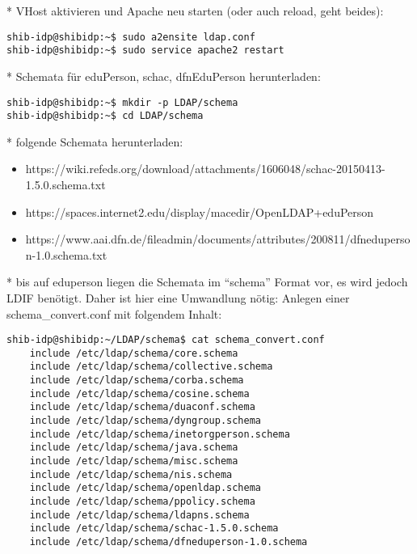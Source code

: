* VHost aktivieren und Apache neu starten (oder auch reload, geht beides):
\begin{lstlisting}
shib-idp@shibidp:~$ sudo a2ensite ldap.conf
shib-idp@shibidp:~$ sudo service apache2 restart
\end{lstlisting}

* Schemata für eduPerson, schac, dfnEduPerson herunterladen:
\begin{lstlisting}
shib-idp@shibidp:~$ mkdir -p LDAP/schema
shib-idp@shibidp:~$ cd LDAP/schema
\end{lstlisting}
* folgende Schemata herunterladen:
\begin{itemize}
  \item
  https://wiki.refeds.org/download/attachments/1606048/schac-20150413-1.5.0.schema.txt
  \item https://spaces.internet2.edu/display/macedir/OpenLDAP+eduPerson
  \item
  https://www.aai.dfn.de/fileadmin/documents/attributes/200811/dfneduperson-1.0.schema.txt
\end{itemize}

* bis auf eduperson liegen die Schemata im "`schema"' Format vor, es wird jedoch LDIF benötigt. Daher ist hier eine Umwandlung nötig:
\newline * Anlegen einer schema\_convert.conf mit folgendem Inhalt:
\begin{lstlisting}
shib-idp@shibidp:~/LDAP/schema$ cat schema_convert.conf 
	include /etc/ldap/schema/core.schema
	include /etc/ldap/schema/collective.schema
	include /etc/ldap/schema/corba.schema
	include /etc/ldap/schema/cosine.schema
	include /etc/ldap/schema/duaconf.schema
	include /etc/ldap/schema/dyngroup.schema
	include /etc/ldap/schema/inetorgperson.schema
	include /etc/ldap/schema/java.schema
	include /etc/ldap/schema/misc.schema
	include /etc/ldap/schema/nis.schema
	include /etc/ldap/schema/openldap.schema
	include /etc/ldap/schema/ppolicy.schema
	include /etc/ldap/schema/ldapns.schema
	include /etc/ldap/schema/schac-1.5.0.schema
	include /etc/ldap/schema/dfneduperson-1.0.schema
\end{lstlisting}
					

